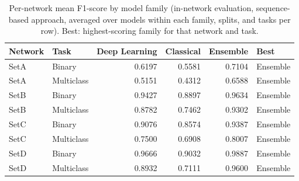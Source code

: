 \begin{table}
\caption{Per-network mean F1-score by model family (in-network evaluation, sequence-based approach, averaged over models within each family, splits, and tasks per row). Best: highest-scoring family for that network and task.}
\label{tab:q6_per_network}
\begin{tabular}{llrrrl}
\toprule
Network & Task & Deep Learning & Classical & Ensemble & Best \\
\midrule
SetA & Binary & 0.6197 & 0.5581 & 0.7104 & Ensemble \\
SetA & Multiclass & 0.5151 & 0.4312 & 0.6588 & Ensemble \\
SetB & Binary & 0.9427 & 0.8897 & 0.9634 & Ensemble \\
SetB & Multiclass & 0.8782 & 0.7462 & 0.9302 & Ensemble \\
SetC & Binary & 0.9076 & 0.8574 & 0.9387 & Ensemble \\
SetC & Multiclass & 0.7500 & 0.6908 & 0.8007 & Ensemble \\
SetD & Binary & 0.9666 & 0.9032 & 0.9887 & Ensemble \\
SetD & Multiclass & 0.8932 & 0.7111 & 0.9600 & Ensemble \\
\bottomrule
\end{tabular}
\end{table}
